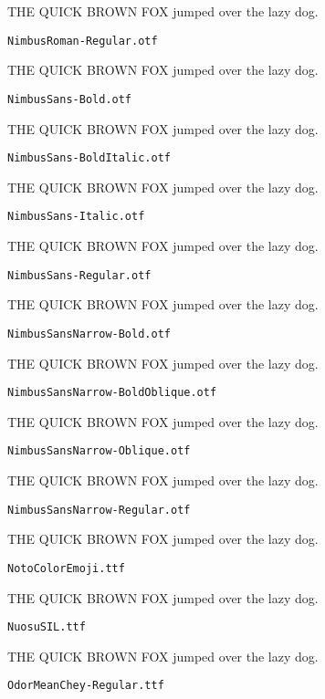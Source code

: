 \documentclass{article}
\begin{document}
THE QUICK BROWN FOX jumped over the lazy dog.

\setmainfont[Extension=.otf]{NimbusRoman-Regular}
\noindent \verb!NimbusRoman-Regular.otf!

THE QUICK BROWN FOX jumped over the lazy dog.

\setmainfont[Extension=.otf]{NimbusSans-Bold}
\noindent \verb!NimbusSans-Bold.otf!

THE QUICK BROWN FOX jumped over the lazy dog.

\setmainfont[Extension=.otf]{NimbusSans-BoldItalic}
\noindent \verb!NimbusSans-BoldItalic.otf!

THE QUICK BROWN FOX jumped over the lazy dog.

\setmainfont[Extension=.otf]{NimbusSans-Italic}
\noindent \verb!NimbusSans-Italic.otf!

THE QUICK BROWN FOX jumped over the lazy dog.

\setmainfont[Extension=.otf]{NimbusSans-Regular}
\noindent \verb!NimbusSans-Regular.otf!

THE QUICK BROWN FOX jumped over the lazy dog.

\setmainfont[Extension=.otf]{NimbusSansNarrow-Bold}
\noindent \verb!NimbusSansNarrow-Bold.otf!

THE QUICK BROWN FOX jumped over the lazy dog.

\setmainfont[Extension=.otf]{NimbusSansNarrow-BoldOblique}
\noindent \verb!NimbusSansNarrow-BoldOblique.otf!

THE QUICK BROWN FOX jumped over the lazy dog.

\setmainfont[Extension=.otf]{NimbusSansNarrow-Oblique}
\noindent \verb!NimbusSansNarrow-Oblique.otf!

THE QUICK BROWN FOX jumped over the lazy dog.

\setmainfont[Extension=.otf]{NimbusSansNarrow-Regular}
\noindent \verb!NimbusSansNarrow-Regular.otf!

THE QUICK BROWN FOX jumped over the lazy dog.

\setmainfont[Extension=.ttf]{NotoColorEmoji}
\noindent \verb!NotoColorEmoji.ttf!

THE QUICK BROWN FOX jumped over the lazy dog.

\setmainfont[Extension=.ttf]{NuosuSIL}
\noindent \verb!NuosuSIL.ttf!

THE QUICK BROWN FOX jumped over the lazy dog.

\setmainfont[Extension=.ttf]{OdorMeanChey-Regular}
\noindent \verb!OdorMeanChey-Regular.ttf!
\end{document}

